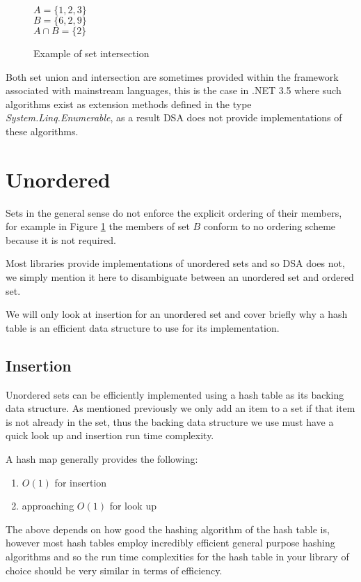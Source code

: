 \begin{figure}
\begin{center}
$A = \{1, 2, 3\}$ \\
$B = \{6, 2, 9\}$ \\
$A \cap B= \{2\}$
\end{center}
\caption{Example of set intersection} \label{fig:set_intersection_example}
\end{figure}

Both set union and intersection are sometimes provided within the framework associated with mainstream languages, this is the case in .NET 3.5 where such algorithms exist as extension methods defined in the type \textit{System.Linq.Enumerable}, as a result DSA does not provide implementations of these algorithms.

\section{Unordered}
Sets in the general sense do not enforce the explicit ordering of their members, for example in Figure \ref{fig:set_intersection_example} the members of set $B$ conform to no ordering scheme because it is not required. 

Most libraries provide implementations of unordered sets and so DSA does not, we simply mention it here to disambiguate between an unordered set and ordered set. 

We will only look at insertion for an unordered set and cover briefly why a hash table is an efficient data structure to use for its implementation.

\subsection{Insertion}
Unordered sets can be efficiently implemented using a hash table as its backing data structure. As mentioned previously we only add an item to a set if that item is not already in the set, thus the backing data structure we use must have a quick look up and insertion run time complexity.

A hash map generally provides the following:

\begin{enumerate}
\item $O(1)$ for insertion
\item approaching $O(1)$ for look up
\end{enumerate}

The above depends on how good the hashing algorithm of the hash table is, however most hash tables employ incredibly efficient general purpose hashing algorithms and so the run time complexities for the hash table in your library of choice should be very similar in terms of efficiency.

